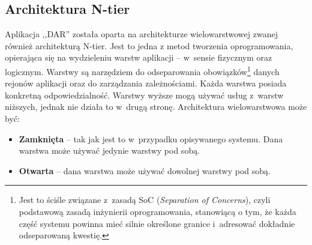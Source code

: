 \subsection{Architektura N-tier}
\label{sec:architekturaNTier}
Aplikacja ,,DAR'' została oparta na architekturze wielowarstwowej zwanej również architekturą N-tier. Jest to jedna z metod tworzenia oprogramowania, opierająca się na wydzieleniu warstw aplikacji -- w~sensie fizycznym oraz logicznym. Warstwy są narzędziem do odseparowania obowiązków\footnote{Jest to ściśle związane z~zasadą SoC (\emph{Separation of Concerns}), czyli podstawową zasadą inżynierii oprogramowania, stanowiącą o tym, że każda część systemu powinna mieć silnie określone granice i~adresować dokładnie odseparowaną kwestię.} danych rejonów aplikacji oraz do zarządzania zależnościami. Każda warstwa posiada konkretną odpowiedzialność. Warstwy wyższe mogą używać usług z~warstw niższych, jednak nie działa to w~drugą stronę. Architektura wielowarstwowa może być:
\begin{itemize}
    \item \textbf{Zamknięta} -- tak jak jest to w~przypadku opisywanego systemu. Dana warstwa może używać jedynie warstwy pod sobą.
    \item \textbf{Otwarta} -- dana warstwa może używać dowolnej warstwy pod sobą.
\end{itemize}

